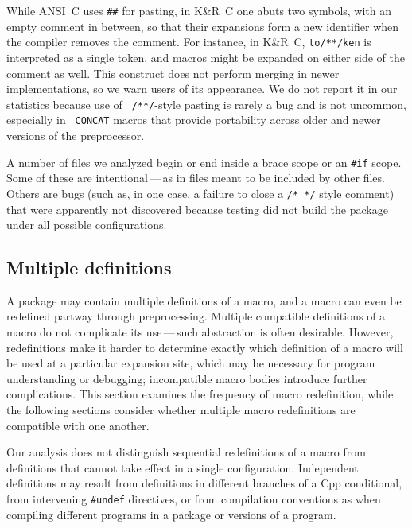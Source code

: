 \documentclass[10pt]{article}
\begin{document}
While ANSI~C uses {\tt \#\#} for pasting, in K\&R~C one abuts two symbols,
with an empty comment in between, so that their expansions form a new
identifier when the compiler removes the comment.  For instance, in K\&R~C,
{\tt to/**/ken} is interpreted as a single token, and macros might be
expanded on either side of the comment as well.  This construct does not
perform merging in newer implementations, so we warn users of its
appearance.  We do not report it in our statistics because use of {\tt
/**/}-style pasting is rarely a bug and is not uncommon, especially in {\tt
CONCAT} macros that provide portability across older and newer versions of
the preprocessor.

A number of files we analyzed begin or end inside a brace scope or an
{\tt \#if} scope.  Some of these are intentional\,---\,as in files meant to
be included by other files.  Others are bugs (such as, in one case, a
failure to close a {\tt /* */} style comment) that were apparently not
discovered because testing did not build the package under all possible
configurations.



\subsection{Multiple definitions}
\label{sec:mult-def}

A package may contain multiple definitions of a macro, and a macro can even
be redefined partway through preprocessing.  Multiple compatible
definitions of a macro do not complicate its use\,---\,such abstraction is
often desirable.  However, redefinitions make it harder to determine
exactly which definition of a macro will be used at a particular expansion
site, which may be necessary for program understanding or debugging;
incompatible macro bodies introduce further complications.  This section
examines the frequency of macro redefinition, while the following sections
consider whether multiple macro redefinitions are compatible with one
another.

Our analysis does not distinguish sequential redefinitions of a macro from
definitions that cannot take effect in a single configuration.
Independent definitions may result from definitions in different branches
of a Cpp conditional, from intervening {\tt \#undef} directives, or from
compilation conventions as when compiling different programs in a package
or versions of a program.
\end{document}
